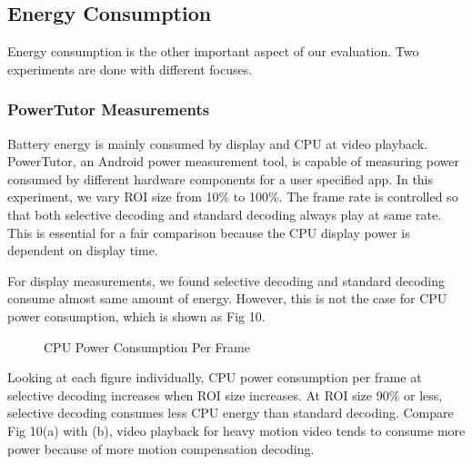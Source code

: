  
\subsection{Energy Consumption} 
Energy consumption is the other important aspect of our evaluation. Two experiments are done with different focuses.

\subsubsection{PowerTutor Measurements}
Battery energy is mainly consumed by display and CPU at video playback. PowerTutor\cite{Zhang:2010:AOP:1878961.1878982}, an Android power measurement tool, is capable of measuring power consumed by different hardware components for a user specified app. In this experiment, we vary ROI size from 10\% to 100\%. The frame rate is controlled so that both selective decoding and standard decoding always play at same rate. This is essential for a fair comparison because the CPU display power is dependent on display time. 

For display measurements, we found selective decoding and standard decoding consume almost same amount of energy. However, this is not the case for CPU power consumption, which is shown as Fig 10.
 
\begin{figure}
\centering
\caption{CPU Power Consumption Per Frame}
\end{figure}
Looking at each figure individually, CPU power consumption per frame at selective decoding increases when ROI size increases. At ROI size 90\% or less, selective decoding consumes less CPU energy than standard decoding. Compare Fig 10(a) with (b), video playback for heavy motion video tends to consume more power because of more motion compensation decoding. 

